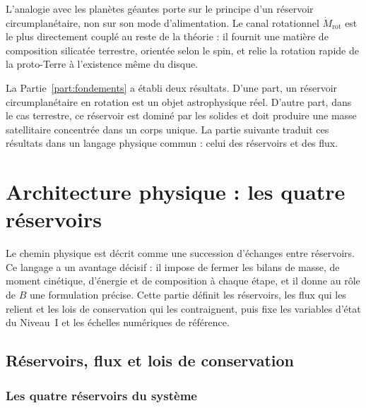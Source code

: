 \documentclass[11pt,a4paper,openany]{report}
\begin{document}
\begin{lecture}
L'analogie avec les planètes géantes porte sur le principe d'un réservoir circumplanétaire, non
sur son mode d'alimentation. Le canal rotationnel $\dot M_{\mathrm{rot}}$ est le plus directement
couplé au reste de la théorie : il fournit une matière de composition silicatée terrestre, orientée
selon le spin, et relie la rotation rapide de la proto-Terre à l'existence même du disque.
\end{lecture}


\begin{rappel}
La Partie~\ref{part:fondements} a établi deux résultats. D'une part, un réservoir circumplanétaire
en rotation est un objet astrophysique réel. D'autre part, dans le cas terrestre, ce réservoir est
dominé par les solides et doit produire une masse satellitaire concentrée dans un corps unique.
La partie suivante traduit ces résultats dans un langage physique commun : celui des réservoirs et
des flux.
\end{rappel}

\part{Architecture physique : les quatre réservoirs}
\label{part:architecture}

\noindent
Le chemin physique est décrit comme une succession d'échanges entre réservoirs. Ce langage a
un avantage décisif : il impose de fermer les bilans de masse, de moment cinétique, d'énergie et
de composition à chaque étape, et il donne au rôle de $B$ une formulation précise. Cette partie
définit les réservoirs, les flux qui les relient et les lois de conservation qui les contraignent,
puis fixe les variables d'état du Niveau~I et les échelles numériques de référence.

\chapter{Réservoirs, flux et lois de conservation}
\label{ch:reservoirs}

\section{Les quatre réservoirs du système}
\end{document}
